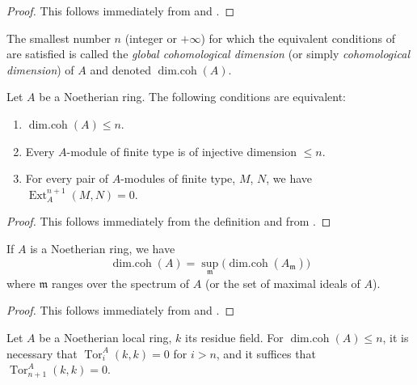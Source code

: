 \begin{proof}
This follows immediately from  and .
\end{proof}

The smallest number $n$ (integer or $+\infty$) for which the equivalent conditions of  are satisfied is called the \emph{global cohomological dimension} (or simply \emph{cohomological dimension}) of $A$ and denoted $\operatorname{dim.coh}(A)$.

\begin{proposition}[17.2.9]
\label{0.17.2.9}
Let $A$ be a Noetherian ring.
The following conditions are equivalent:
\begin{enumerate}
  \item[{\rm a)}] $\operatorname{dim.coh}(A)\leq n$.
  \item[{\rm b)}] Every $A$-module of finite type is of injective dimension $\leq n$.
  \item[{\rm c)}] For every pair of $A$-modules of finite type, $M$, $N$, we have $\operatorname{Ext}^{n+1}_A(M,N)=0$.
\end{enumerate}
\end{proposition}

\begin{proof}
This follows immediately from the definition and from .
\end{proof}

\begin{corollary}[17.2.10]
\label{0.17.2.10}
If $A$ is a Noetherian ring, we have
\[
\label{0.17.2.10.1}
  \operatorname{dim.coh}(A)=\sup_\mathfrak{m}\big(\operatorname{dim.coh}(A_\mathfrak{m})\big)
  \tag{17.2.10.1}
\]
where $\mathfrak{m}$ ranges over the spectrum of $A$ \textup{(}or the set of maximal ideals of $A$\textup{)}.
\end{corollary}

\begin{proof}
This follows immediately from  and .
\end{proof}

\begin{proposition}[17.2.11]
\label{0.17.2.11}
Let $A$ be a Noetherian local ring, $k$ its residue field.
For $\operatorname{dim.coh}(A)\leq n$, it is necessary that $\operatorname{Tor}^A_i(k,k)=0$ for $i>n$, and it suffices that $\operatorname{Tor}^A_{n+1}(k,k)=0$.
\end{proposition}

